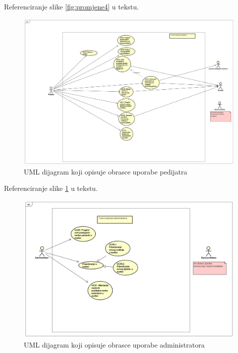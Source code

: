 					Referenciranje slike \ref{fig:promjene4} u tekstu.
					
					\begin{figure}[H]
						\includegraphics[width=\textwidth]{slike/UCpedijatar.PNG} %
						\caption{UML dijagram koji opisuje obrasce uporabe pedijatra}
						\label{fig:promjene5} %
					\end{figure}
					
					Referenciranje slike \ref{fig:promjene5} u tekstu.
					
					\begin{figure}[H]
						\includegraphics[width=\textwidth]{slike/UCadmin.PNG} %
						\caption{UML dijagram koji opisuje obrasce uporabe administratora}
						\label{fig:promjene6} %
					\end{figure}
					
